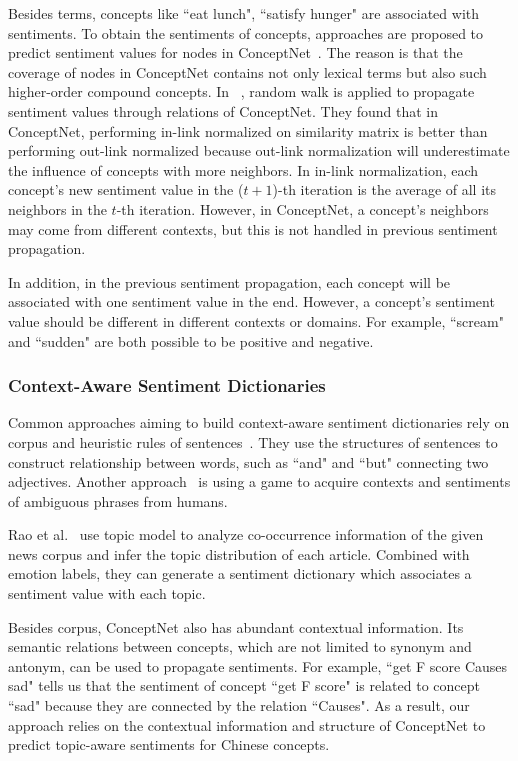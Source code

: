 Besides terms, concepts like ``eat lunch", ``satisfy hunger" are associated with sentiments. To obtain the sentiments of concepts, approaches are proposed to predict sentiment values for nodes in ConceptNet~\cite{Liu:IUI03, Cambria:AAAI10, Wu:TAAI11, Tsai:IEEE13, Wu:relSelect14}. The reason is that the coverage of nodes in ConceptNet contains not only lexical terms but also such higher-order compound concepts. In ~\cite{Tsai:IEEE13, Wu:relSelect14}, random walk is applied to propagate sentiment values through relations of ConceptNet. They found that in ConceptNet, performing in-link normalized on similarity matrix is better than performing out-link normalized because out-link normalization will underestimate the influence of concepts with more neighbors. In in-link normalization, each concept's new sentiment value in the ($t+1$)-th iteration is the average of all its neighbors in the $t$-th iteration. However, in ConceptNet, a concept's neighbors may come from different contexts, but this is not handled in previous sentiment propagation.

In addition, in the previous sentiment propagation, each concept will be associated with one sentiment value in the end. However, a concept's sentiment value should be different in different contexts or domains. For example, ``scream" and ``sudden" are both possible to be positive and negative. 

\subsubsection{Context-Aware Sentiment Dictionaries}
Common approaches aiming to build context-aware sentiment dictionaries rely on corpus and heuristic rules of sentences~\cite{Xu:PACLIC10, Xu:COLING10, Lu:WWW11}. They use the structures of sentences to construct relationship between words, such as ``and" and ``but" connecting two adjectives. Another approach~\cite{Boia:AAAI14} is using a game to acquire contexts and sentiments of ambiguous phrases from humans. 

Rao et al.~\cite{Rao:WWW14} use topic model to analyze co-occurrence information of the given news corpus and infer the topic distribution of each article. Combined with emotion labels, they can generate a sentiment dictionary which associates a sentiment value with each topic. 

Besides corpus, ConceptNet also has abundant contextual information. Its semantic relations between concepts, which are not limited to synonym and antonym, can be used to propagate sentiments. For example, ``get F score Causes sad" tells us that the sentiment of concept ``get F score" is related to concept ``sad" because they are connected by the relation ``Causes". As a result, our approach relies on the contextual information and structure of ConceptNet to predict topic-aware sentiments for Chinese concepts.